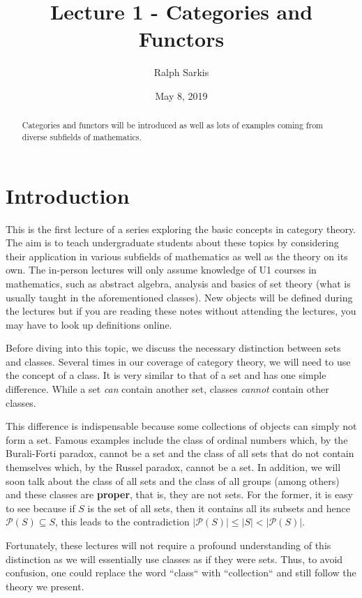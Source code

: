 \documentclass{article}
\title{Lecture 1 - Categories and Functors\vspace{-10pt}}
\author{Ralph Sarkis}
\date{\vspace{-10pt}May 8, 2019\vspace{-20pt}}  %
\theoremstyle{definition}
\theoremstyle{remark}
\newcommand{\mP}{\mathcal{P}}
\begin{document}
\maketitle
\begin{abstract} Categories and functors will be introduced as well as lots of examples coming from diverse subfields of mathematics.
\end{abstract}
\setcounter{section}{-1}
\section{Introduction}
This is the first lecture of a series exploring the basic concepts in category theory. The aim is to teach undergraduate students about these topics by considering their application in various subfields of mathematics as well as the theory on its own. The in-person lectures will only assume knowledge of U1 courses in mathematics, such as abstract algebra, analysis and basics of set theory (what is usually taught in the aforementioned classes). New objects will be defined during the lectures but if you are reading these notes without attending the lectures, you may have to look up definitions online.

Before diving into this topic, we discuss the necessary distinction between sets and classes. Several times in our coverage of category theory, we will need to use the concept of a class. It is very similar to that of a set and has one simple difference. While a set \textit{can} contain another set, classes \textit{cannot} contain other classes.

This difference is indispensable because some collections of objects can simply not form a set. Famous examples include the class of ordinal numbers which, by the Burali-Forti paradox, cannot be a set and the class of all sets that do not contain themselves which, by the Russel paradox, cannot be a set. In addition, we will soon talk about the class of all sets and the class of all groups (among others) and these classes are \textbf{proper}, that is, they are not sets. For the former, it is easy to see because if $S$ is the set of all sets, then it contains all its subsets and hence $\mP(S) \subseteq S$, this leads to the contradiction $|\mP(S)| \leq |S| < |\mP(S)|$.

Fortunately, these lectures will not require a profound understanding of this distinction as we will essentially use classes as if they were sets. Thus, to avoid confusion, one could replace the word ``class`` with ``collection`` and still follow the theory we present.
\end{document}
